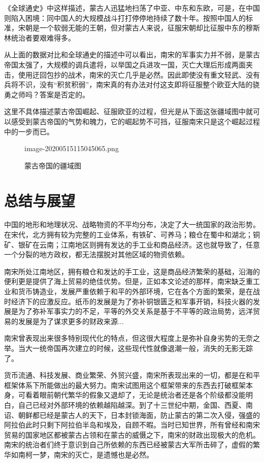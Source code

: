 \documentclass[final]{cvpr}
\begin{document}
《全球通史》\cite{全球通史}中这样描述，蒙古人迅猛地扫荡了中亚、中东和东欧，可是，在中国则陷入困境：同中国人的大规模战斗打打停停地持续了数十年。按照中国人的标准，宋朝是一个软弱无能的王朝，但对蒙古人来说，征服宋朝却比征服中东的穆斯林统治者要艰难得多。

从上面的数据对比和全球通史的描述中可以看出，南宋的军事实力并不弱，是蒙古帝国太强了，大规模的调兵遣将，以举国之兵进攻一国，灭亡大理后形成两面夹击，使用迂回包抄的战术，南宋的灭亡几乎是必然。因此即使没有重文轻武、没有兵将不识，没有“积贫积弱”，南宋真的有办法对付这支即将征服整个欧亚大陆的骁勇之师吗？答案是否定的。

这里不具体描述蒙古帝国崛起、征服欧亚的过程，但光是从下面这张疆域图中就可以感受到蒙古帝国的气势和魄力，它的崛起势不可挡，征服南宋只是这个崛起过程中的一步而已。

\begin{figure}[h]
  	\begin{overpic}[width=\columnwidth]{image-20200515115045065.png}
    \end{overpic}
    \caption{蒙古帝国的疆域图
    }\label{fig:colorFre}
\end{figure}


\section{总结与展望}\label{sec:Conclusion}

中国的地形和地理状况、战略物资的不平均分布，决定了大一统国家的政治形势。在宋代，北方拥有较为完整的工业体系，有铁矿、可养马；粮仓在蜀中和湖北；铜矿、银矿在云南；江南地区则拥有发达的手工业和商品经济。这也就导致了，任意一个分裂的地方政权，都无法摆脱对其他区域的物资依赖。

南宋所处江南地区，拥有粮仓和发达的手工业，这是商品经济繁荣的基础，沿海的便利更是提供了海上贸易的绝佳优势。但是，正如本文论述的那样，南宋缺乏重工业和货币铸造业，发展严重依赖于和平的外部环境，它在各个方面的繁荣，是在战时经济下的应激反应。纸币的发展是为了弥补铜银匮乏和军事开销，科技火器的发展是为了弥补军事实力的不足，平等的外交关系是基于不平等的政治局势，远洋贸易的发展是为了谋求更多的财政来源...

南宋曾表现出来很多特别现代化的特点，但这很大程度上是弥补自身劣势的无奈之举。当大一统帝国再次建立的时候，这些现代性就像退潮一般，消失的无影无踪了。

货币流通、科技发展、商业繁荣、外贸兴盛，南宋所表现出来的一切，都是在和平框架体系下所能做出的最大努力。南宋试图用这个框架带来的东西去打破框架本身，可看着眼前朝代繁华的假象又退却了，无论是统治者还是各个阶级都没能明白，自己已经对外部环境的依赖越陷越深。到了十三世纪中期，金国、西夏、南诏、朝鲜都已经是蒙古人的天下，日本封锁海面，防止蒙古的第二次入侵，强盛的阿拉伯此时只剩下阿拉伯半岛和埃及，自顾不暇。当时已知世界，所有曾经和南宋贸易的国家地区都被蒙古占领和在蒙古的威慑之下，南宋的财政出现极大的危机。南宋的统治者们终于意识到自己所依赖的东西已经被蒙古大军所击碎了，虚假的繁华如南柯一梦，南宋的灭亡，是遗憾也是必然。
\end{document}
